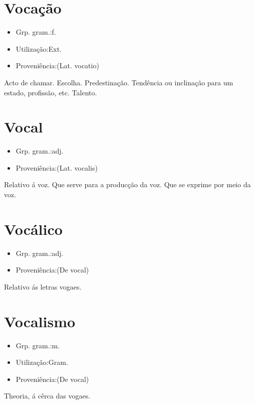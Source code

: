 \documentclass{article}
\begin{document}
\section{Vocação}
\begin{itemize}
\item {Grp. gram.:f.}
\end{itemize}
\begin{itemize}
\item {Utilização:Ext.}
\end{itemize}
\begin{itemize}
\item {Proveniência:(Lat. \textunderscore vocatio\textunderscore )}
\end{itemize}
Acto de chamar.
Escolha.
Predestinação.
Tendência ou inclinação para um estado, profissão, etc.
Talento.
\section{Vocal}
\begin{itemize}
\item {Grp. gram.:adj.}
\end{itemize}
\begin{itemize}
\item {Proveniência:(Lat. \textunderscore vocalis\textunderscore )}
\end{itemize}
Relativo á voz.
Que serve para a producção da voz.
Que se exprime por meio da voz.
\section{Vocálico}
\begin{itemize}
\item {Grp. gram.:adj.}
\end{itemize}
\begin{itemize}
\item {Proveniência:(De \textunderscore vocal\textunderscore )}
\end{itemize}
Relativo ás letras vogaes.
\section{Vocalismo}
\begin{itemize}
\item {Grp. gram.:m.}
\end{itemize}
\begin{itemize}
\item {Utilização:Gram.}
\end{itemize}
\begin{itemize}
\item {Proveniência:(De \textunderscore vocal\textunderscore )}
\end{itemize}
Theoria, á cêrca das vogaes.
\end{document}
